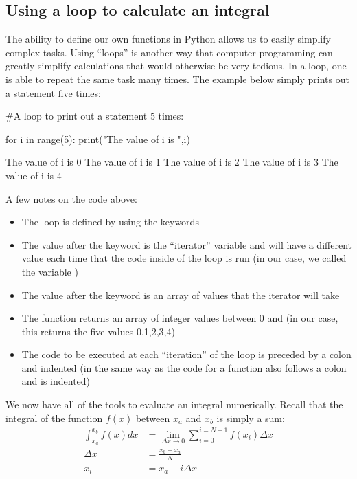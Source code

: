 \subsection{Using a loop to calculate an integral}
The ability to define our own functions in Python allows us to easily simplify complex tasks. Using ``loops'' is another way that computer programming can greatly simplify calculations that would otherwise be very tedious. In a loop, one is able to repeat the same task many times. The example below simply prints out a statement five times:
\begin{python}[caption=A simple loop] 
#A loop to print out a statement 5 times:

for i in range(5):
  print("The value of i is ",i)
\end{python}
\begin{poutput}
The value of i is  0
The value of i is  1
The value of i is  2
The value of i is  3
The value of i is  4
\end{poutput}
A few notes on the code above:
\begin{itemize}
\item The loop is defined by using the keywords 
\item The value after the keyword  is the ``iterator'' variable and will have a different value each time that the code inside of the loop is run (in our case, we called the variable )
\item The value after the keyword  is an array of values that the iterator will take
\item The  function returns an array of  integer values between 0 and  (in our case, this returns the five values 0,1,2,3,4)
\item The code to be executed at each ``iteration'' of the loop is preceded by a colon and indented (in the same way as the code for a function also follows a colon and is indented)
\end{itemize}
We now have all of the tools to evaluate an integral numerically. Recall that the integral of the function $f(x)$ between $x_a$ and $x_b$ is simply a sum:
\begin{align*}
\int_{x_a}^{x_b} f(x) dx&=\lim_{\Delta x \to 0} \sum_{i=0}^{i=N-1} f(x_{i})\Delta x\\
\Delta x &= \frac{x_b-x_a}{N}\\
x_i&=x_a+i\Delta x\\
\end{align*}
